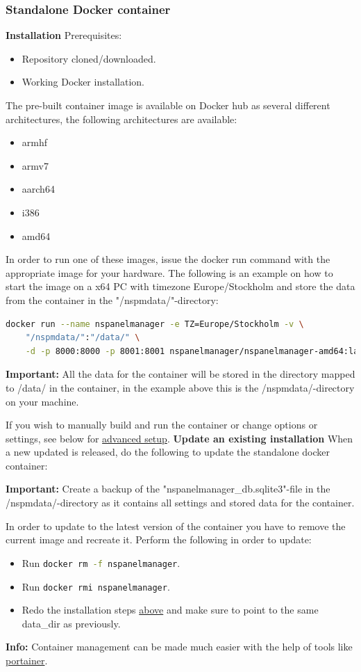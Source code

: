 \documentclass[10pt]{article}
\newcommand{\info}[1]{\begin{infoBox} \textbf{Info:} #1 \end{infoBox}}
\newcommand{\important}[1]{\begin{importantBox} \textbf{Important:} #1 \end{importantBox}}
\begin{document}
    \subsubsection{Standalone Docker container}
    \label{sec:standalone_docker_container}
    \textbf{Installation}\newline
    Prerequisites:
    \begin{itemize}
      \item Repository cloned/downloaded.
      \item Working Docker installation.
    \end{itemize}
    The pre-built container image is available on Docker hub as several different architectures, the following architectures are available:
    \begin{itemize}
      \item armhf
      \item armv7
      \item aarch64
      \item i386
      \item amd64
    \end{itemize}
    In order to run one of these images, issue the docker run command with the appropriate image for your hardware. The following is an example on how to start the image on a x64 PC with timezone Europe/Stockholm and store the data from the container in the "/nspmdata/"-directory:
    \begin{lstlisting}[language=bash]
    docker run --name nspanelmanager -e TZ=Europe/Stockholm -v \
    "/nspmdata/":"/data/" \
    -d -p 8000:8000 -p 8001:8001 nspanelmanager/nspanelmanager-amd64:latest
    \end{lstlisting}
    \important{All the data for the container will be stored in the directory mapped to /data/ in the container, in the example above this is the /nspmdata/-directory on your machine.}
    If you wish to manually build and run the container or change options or settings, see below for \hyperref[sec:advanced_setup]{advanced setup}.
    \bigbreak
    \textbf{Update an existing installation}\newline
    When a new updated is released, do the following to update the standalone docker container:
    \important{Create a backup of the "nspanelmanager\_db.sqlite3"-file in the /nspmdata/-directory as it contains all settings and stored data for the container.}
    In order to update to the latest version of the container you have to remove the current image and recreate it. Perform the following in order to update:
    \begin{itemize}
      \item Run \lstinline[language=bash]{docker rm -f nspanelmanager}.
      \item Run \lstinline[language=bash]{docker rmi nspanelmanager}.
      \item Redo the installation steps \hyperref[sec:standalone_docker_container]{above} and make sure to point to the same data\_dir as previously.
    \end{itemize}
    \info{Container management can be made much easier with the help of tools like \href{https://www.portainer.io/}{portainer}.}
\end{document}
